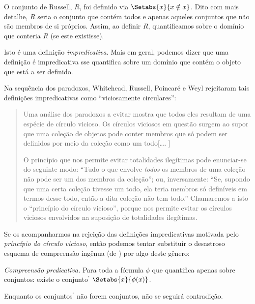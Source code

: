 \documentclass[../../../include/open-logic-section]{subfiles}
\begin{document}


O conjunto de Russell, $R$, foi definido via $\Setabs{x}{x \notin
x}$. Dito com mais detalhe, $R$ seria o conjunto que contém todos
e apenas aqueles conjuntos que não são membros de si próprios. Assim, ao definir
$R$, quantificamos sobre o domínio que conteria $R$ (se este
existisse).

Isto é uma definição \emph{impredicativa}. Mais em geral, podemos
dizer que uma definição é impredicativa sse quantifica sobre um domínio
que contém o objeto que está a ser definido.  
	
Na sequência dos paradoxos, Whitehead, Russell, Poincar\'{e} e
Weyl rejeitaram tais definições impredicativas como ``viciosamente
circulares'':
\begin{quote}
	Uma análise dos paradoxos a evitar mostra que todos eles
	resultam de uma espécie de círculo vicioso. Os círculos viciosos em
	questão surgem ao supor que uma coleção de objetos pode
	conter membros que só podem ser definidos por meio da
	coleção como um todo[\ldots. \textparagraph]

	O princípio que nos permite evitar totalidades ilegítimas
	pode enunciar-se do seguinte modo: ``Tudo o que envolve \emph{todos} os
	membros de uma coleção não pode ser um dos membros da coleção''; ou, inversamente:
	``Se, supondo que uma certa coleção tivesse um todo, ela teria
	membros só definíveis em termos desse todo, então a dita
	coleção não tem todo.'' Chamaremos a isto o ``princípio do círculo vicioso'',
	porque nos permite evitar os círculos viciosos
	envolvidos na suposição de totalidades ilegítimas.
	\citep[p.~37]{WhiteheadRussell1910}
\end{quote}
Se os acompanharmos na rejeição das definições impredicativas motivada pelo \emph{princípio do círculo vicioso},
então podemos tentar substituir o desastroso esquema de compreensão ingênua (de ) por algo deste gênero: 

\begin{defish}
\emph{Compreensão predicativa.} Para toda a fórmula $\phi$ que quantifica apenas sobre conjuntos: existe o conjunto$^\prime$ $\Setabs{x}{\phi(x)}$.
\end{defish}

Enquanto os conjuntos$^{\prime}$ não forem conjuntos, não se seguirá contradição.  
\end{document}
